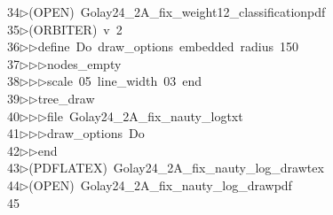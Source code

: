\begin{tabbing}
34\>$\triangleright$\>(OPEN)\ Golay24\_2A\_fix\_weight12\_classificationpdf\\[0pt]
35\>$\triangleright$\>(ORBITER)\ v\ 2\ \\[0pt]
36\>$\triangleright$\>$\triangleright$\>define\ Do\ draw\_options\ embedded\ radius\ 150\ \\[0pt]
37\>$\triangleright$\>$\triangleright$\>$\triangleright$\>nodes\_empty\ \\[0pt]
38\>$\triangleright$\>$\triangleright$\>$\triangleright$\>scale\ 05\ line\_width\ 03\ end\ \\[0pt]
39\>$\triangleright$\>$\triangleright$\>tree\_draw\ \\[0pt]
40\>$\triangleright$\>$\triangleright$\>$\triangleright$\>file\ Golay24\_2A\_fix\_nauty\_logtxt\ \\[0pt]
41\>$\triangleright$\>$\triangleright$\>$\triangleright$\>draw\_options\ Do\ \\[0pt]
42\>$\triangleright$\>$\triangleright$\>end\\[0pt]
43\>$\triangleright$\>(PDFLATEX)\ Golay24\_2A\_fix\_nauty\_log\_drawtex\\[0pt]
44\>$\triangleright$\>(OPEN)\ Golay24\_2A\_fix\_nauty\_log\_drawpdf\\[0pt]
45\>\end{tabbing}
